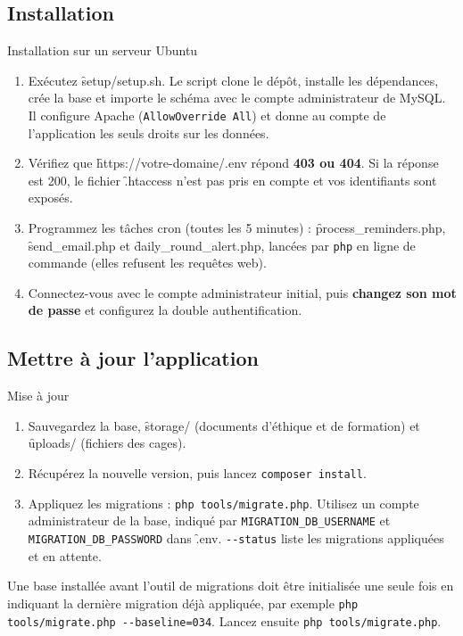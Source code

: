 \documentclass[11pt,a4paper]{article}
\begin{document}
\subsection{Installation}
\begin{procedure}{Installation sur un serveur Ubuntu}
\begin{enumerate}
  \item Exécutez \f{setup/setup.sh}. Le script clone le dépôt, installe les
    dépendances, crée la base et importe le schéma avec le compte
    administrateur de MySQL. Il configure Apache (\texttt{AllowOverride
    All}) et donne au compte de l'application les seuls droits sur les
    données.
  \item Vérifiez que \f{https://votre-domaine/.env} répond \textbf{403 ou
    404}. Si la réponse est 200, le fichier \f{.htaccess} n'est pas pris en
    compte et vos identifiants sont exposés.
  \item Programmez les tâches cron (toutes les 5 minutes) :
    \f{process_reminders.php}, \f{send_email.php} et
    \f{daily_round_alert.php}, lancées par \texttt{php} en ligne de commande
    (elles refusent les requêtes web).
  \item Connectez-vous avec le compte administrateur initial, puis
    \textbf{changez son mot de passe} et configurez la double
    authentification.
\end{enumerate}
\end{procedure}

\subsection{Mettre à jour l'application}
\begin{procedure}{Mise à jour}
\begin{enumerate}
  \item Sauvegardez la base, \f{storage/} (documents d'éthique et de
    formation) et \f{uploads/} (fichiers des cages).
  \item Récupérez la nouvelle version, puis lancez \texttt{composer
    install}.
  \item Appliquez les migrations : \texttt{php tools/migrate.php}. Utilisez
    un compte administrateur de la base, indiqué par
    \texttt{MIGRATION\_DB\_USERNAME} et \texttt{MIGRATION\_DB\_PASSWORD} dans
    \f{.env}. \texttt{-{}-status} liste les migrations appliquées et en
    attente.
\end{enumerate}
\end{procedure}
\begin{regle}
Une base installée avant l'outil de migrations doit être initialisée une
seule fois en indiquant la dernière migration déjà appliquée, par exemple
\texttt{php tools/migrate.php -{}-baseline=034}. Lancez ensuite
\texttt{php tools/migrate.php}.
\end{regle}
\end{document}
